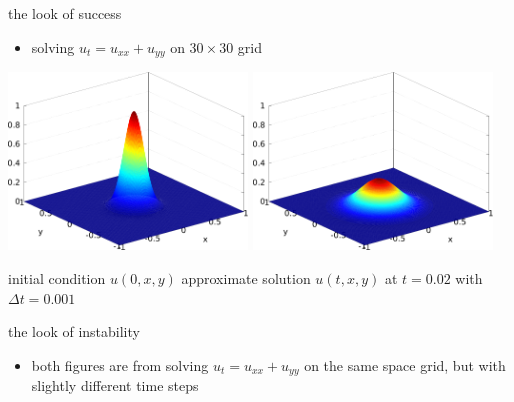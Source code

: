\documentclass[titlepage,letterpaper,final,12pt]{scrartcl}
\begin{document}
the look of success

\begin{itemize}
\item solving $u_t = u_{xx} + u_{yy}$ on $30\times 30$ grid
\end{itemize}


\begin{center}
\includegraphics[width=2.5in]{initialheat}
\quad
\includegraphics[width=2.5in]{finalheat}

initial condition $u(0,x,y)$ \qquad approximate solution $u(t,x,y)$ at $t=0.02$ with $\Delta t=0.001$
\end{center}


the look of instability

\begin{itemize}
\item both figures are from solving $u_t = u_{xx} + u_{yy}$ on the same space grid, but with slightly different time steps
\end{itemize}
\end{document}
